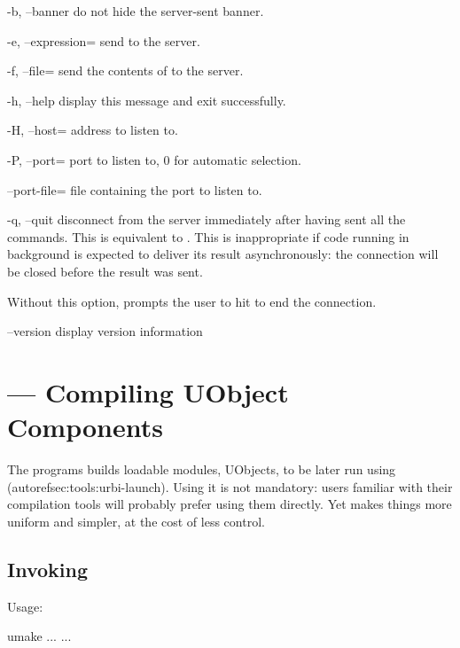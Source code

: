 \begin{options}
\item[-b, --banner] do not hide the server-sent banner.
\item[-e, --expression=\var{script}] send  to the server.
\item[-f, --file=\var{file}] send the contents of  to the
  server.
\item[-h, --help] display this message and exit successfully.
\item[-H, --host=\var{host}] address to listen to.
\item[-P, --port=\var{port}] port to listen to, 0 for automatic
  selection.
\item[--port-file=\var{file}] file containing the port to listen to.
\item[-q, --quit] disconnect from the server immediately after having
  sent all the commands.  This is equivalent to .
  This is inappropriate if code running in background is expected to
  deliver its result asynchronously: the connection will be closed
  before the result was sent.

  Without this option,  prompts the user to hit
   to end the connection.
\item[--version] display version information
\end{options}


\section{ --- Compiling UObject Components}
\label{sec:tools:umake}

The  programs builds loadable modules, UObjects, to be
later run using 
(autoref{sec:tools:urbi-launch}).  Using it is not mandatory: users
familiar with their compilation tools will probably prefer using them
directly.  Yet  makes things more uniform and simpler,
at the cost of less control.

\subsection{Invoking }
\label{sec:tools:umake:invoke}

Usage:
\begin{shell}
umake ... ...
\end{shell}

